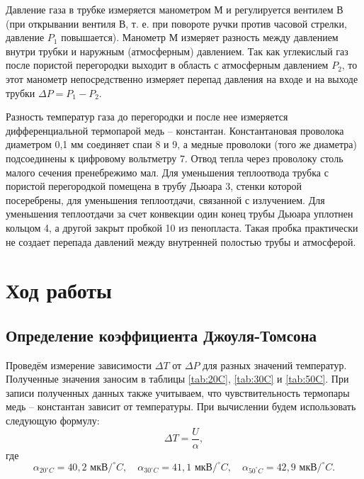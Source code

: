 \documentclass[a4paper,12pt]{article} %
\begin{document}
Давление газа в трубке измеряется манометром М и регулируется вентилем В (при открывании вентиля В, т. е. при повороте ручки против часовой стрелки, давление $ P_1 $ повышается). Манометр М измеряет разность между давлением внутри трубки и наружным (атмосферным) давлением. Так как углекислый газ после пористой перегородки выходит в область с атмосферным давлением $ P_2 $, то этот манометр непосредственно измеряет перепад давления на входе и на выходе трубки $ \Delta P = P_1 - P_2 $.

Разность температур газа до перегородки и после нее измеряется дифференциальной термопарой медь -- константан. Константановая проволока диаметром 0,1 мм соединяет спаи 8 и 9, а медные проволоки (того же диаметра) подсоединены к цифровому вольтметру 7. Отвод тепла через проволоку столь малого сечения пренебрежимо мал. Для уменьшения теплоотвода трубка с пористой перегородкой помещена в трубу Дьюара 3, стенки которой посеребрены, для уменьшения теплоотдачи, связанной с излучением. Для уменьшения теплоотдачи за счет конвекции один конец трубы Дьюара уплотнен кольцом 4, а другой закрыт пробкой 10 из пенопласта. Такая пробка практически не создает перепада давлений между внутренней полостью трубы и атмосферой.

\section{Ход работы}

\subsection{Определение коэффициента Джоуля-Томсона}

Проведём измерение зависимости $ \Delta T $ от $ \Delta P $ для разных значений температур. Полученные значения заносим в таблицы \ref{tab:20C}, \ref{tab:30C} и \ref{tab:50C}. При записи полученных данных также учитываем, что чувствительность термопары медь -- константан зависит от температуры. При вычислении будем использовать следующую формулу: \[ \Delta T = \frac{U}{\alpha}, \] где \[ \alpha_{20^\circ C} = 40,2 \text{ мкВ}/^\circ C, \quad \alpha_{30^\circ C} = 41,1 \text{ мкВ}/^\circ C, \quad \alpha_{50^\circ C} = 42,9 \text{ мкВ}/^\circ C . \]
\end{document}
